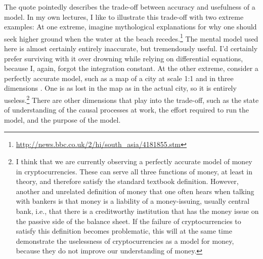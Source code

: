 \documentclass[10pt]{article}
\begin{document}
The quote pointedly describes the trade-off between accuracy and usefulness of a model. In my own lectures, I like to illustrate this trade-off with two extreme examples: At one extreme, imagine mythological explanations for why one should seek higher ground when the water at the beach recedes.\footnote{\url{http://news.bbc.co.uk/2/hi/south_asia/4181855.stm}} The mental model used here is almost certainly entirely inaccurate, but tremendously useful. I'd certainly prefer surviving with it over drowning while relying on  differential equations, because I, again, forgot the integration constant. At the other extreme, consider a perfectly accurate model, such as a map of a city at scale 1:1 and in three dimensions \citep{Borges1999,Casati2024}. One is as lost in the map as in the actual city, so it is entirely useless.\footnote{I think that we are currently observing a perfectly accurate model of money in cryptocurrencies. These can serve all three functions of money, at least in theory, and therefore satisfy the standard textbook definition. However, another and unrelated definition of money that one often hears when talking with bankers is that money is a liability of a money-issuing, usually central bank, i.e., that there is a creditworthy institution that has the money issue on the passive side of the balance sheet. If the failure of cryptocurrencies to satisfy this definition becomes problematic, this will at the same time demonstrate the uselessness of cryptocurrencies as a model for money, because they do not improve our understanding of money.} There are other dimensions that play into the trade-off, such as the state of understanding of the causal processes at work, the effort required to run the model, and the purpose of the model. 
\end{document}
